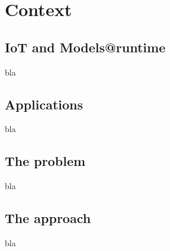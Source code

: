 \chapter{Context}
\label{sec:Context}

\section{IoT and Models@runtime}
bla

\section{Applications}
bla

\section{The problem}
bla

\section{The approach}
bla